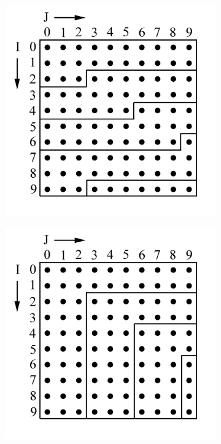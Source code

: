 \begin{figure}
\begin{subfigure}{0.45\textwidth}
  \caption{}
  \label{fig:selective}
\end{subfigure}  \\
\begin{subfigure}{0.45\textwidth}
  \centering
  \includegraphics[width=\textwidth]{Figures/true_distance.jpg}
  \caption{}
  \label{fig:true_distance}
\end{subfigure}
\begin{subfigure}{0.45\textwidth}
  \centering
  \includegraphics[width=\textwidth]{Figures/extended.jpg}

\end{subfigure}
\end{figure}
